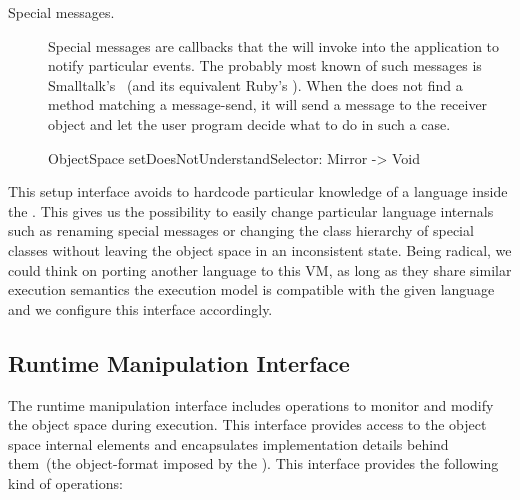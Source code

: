 \begin{description}
\item[Special messages.] Special messages are callbacks that the \VM will invoke into the application to notify particular events. The probably most known of such messages is Smalltalk's ~(and its equivalent Ruby's ). When the \VM does not find a method matching a message-send, it will send a  message to the receiver object and let the user program decide what to do in such a case.

\begin{code}
ObjectSpace {
    setDoesNotUnderstandSelector: Mirror -> Void
}
\end{code}

\end{description}

This \VM setup interface avoids to hardcode particular knowledge of a language inside the \VM. This gives us the possibility to easily change particular language internals such as renaming special messages or changing the class hierarchy of special classes without leaving the object space in an inconsistent state. Being radical, we could think on porting another language to this VM, as long as they share similar execution semantics \ie the \VM execution model is compatible with the given language and we configure this interface accordingly.



\subsection{Runtime Manipulation Interface} 
The runtime manipulation interface includes operations to monitor and modify the object space during execution. This interface provides access to the object space internal elements and encapsulates implementation details behind them~(\ie the object-format imposed by the \VM). This interface provides the following kind of operations:


